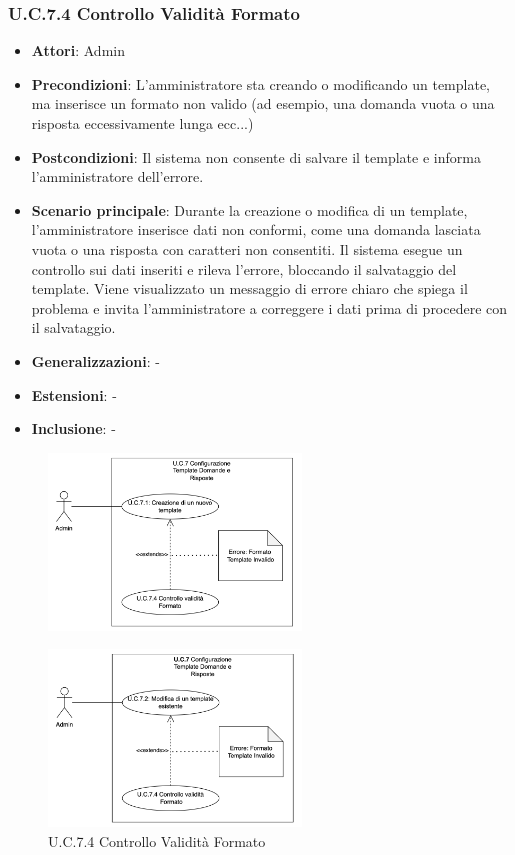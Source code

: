 \subsubsection{U.C.7.4 Controllo Validità Formato}
\begin{itemize}
    \item \textbf{Attori}: Admin
    \item \textbf{Precondizioni}: L'amministratore sta creando o modificando un template, ma inserisce un formato non valido (ad esempio, una domanda vuota o una risposta eccessivamente lunga ecc...)
    \item \textbf{Postcondizioni}: Il sistema non consente di salvare il template e informa l'amministratore dell'errore.
    \item \textbf{Scenario principale}: Durante la creazione o modifica di un template, l'amministratore inserisce dati non conformi, come una domanda lasciata vuota o una risposta con caratteri non consentiti. Il sistema esegue un controllo sui dati inseriti e rileva l'errore, bloccando il salvataggio del template. Viene visualizzato un messaggio di errore chiaro che spiega il problema e invita l'amministratore a correggere i dati prima di procedere con il salvataggio.
    \item \textbf{Generalizzazioni}: -
    \item \textbf{Estensioni}: -
    \item \textbf{Inclusione}: -
\end{itemize}
\begin{figure}[H]
    \centering
    \includegraphics[width=0.6\textwidth]{img/U.C.7.4.1.png}
\end{figure}
\begin{figure}[H]
    \centering
    \includegraphics[width=0.6\textwidth]{img/U.C.7.4.2.png}
    \caption{U.C.7.4 Controllo Validità Formato}
\end{figure}
\newpage

